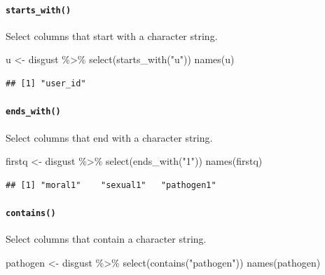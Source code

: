 \documentclass[
  oneside]{book}
\newenvironment{Shaded}{\begin{snugshade}}{\end{snugshade}}
\newcommand{\FunctionTok}[1]{\textcolor[rgb]{0.00,0.00,0.00}{#1}}
\newcommand{\NormalTok}[1]{#1}
\newcommand{\OtherTok}[1]{\textcolor[rgb]{0.56,0.35,0.01}{#1}}
\newcommand{\SpecialCharTok}[1]{\textcolor[rgb]{0.00,0.00,0.00}{#1}}
\newcommand{\StringTok}[1]{\textcolor[rgb]{0.31,0.60,0.02}{#1}}
\begin{document}
\hypertarget{starts_with}{%
\paragraph{\texorpdfstring{\texttt{starts\_with()}}{starts\_with()}}\label{starts_with}}

Select columns that start with a character string.

\begin{Shaded}
\begin{Highlighting}[]
\NormalTok{u }\OtherTok{\textless{}{-}}\NormalTok{ disgust }\SpecialCharTok{\%\textgreater{}\%} \FunctionTok{select}\NormalTok{(}\FunctionTok{starts\_with}\NormalTok{(}\StringTok{"u"}\NormalTok{))}
\FunctionTok{names}\NormalTok{(u)}
\end{Highlighting}
\end{Shaded}

\begin{verbatim}
## [1] "user_id"
\end{verbatim}

\hypertarget{ends_with}{%
\paragraph{\texorpdfstring{\texttt{ends\_with()}}{ends\_with()}}\label{ends_with}}

Select columns that end with a character string.

\begin{Shaded}
\begin{Highlighting}[]
\NormalTok{firstq }\OtherTok{\textless{}{-}}\NormalTok{ disgust }\SpecialCharTok{\%\textgreater{}\%} \FunctionTok{select}\NormalTok{(}\FunctionTok{ends\_with}\NormalTok{(}\StringTok{"1"}\NormalTok{))}
\FunctionTok{names}\NormalTok{(firstq)}
\end{Highlighting}
\end{Shaded}

\begin{verbatim}
## [1] "moral1"    "sexual1"   "pathogen1"
\end{verbatim}

\hypertarget{contains}{%
\paragraph{\texorpdfstring{\texttt{contains()}}{contains()}}\label{contains}}

Select columns that contain a character string.

\begin{Shaded}
\begin{Highlighting}[]
\NormalTok{pathogen }\OtherTok{\textless{}{-}}\NormalTok{ disgust }\SpecialCharTok{\%\textgreater{}\%} \FunctionTok{select}\NormalTok{(}\FunctionTok{contains}\NormalTok{(}\StringTok{"pathogen"}\NormalTok{))}
\FunctionTok{names}\NormalTok{(pathogen)}
\end{Highlighting}
\end{Shaded}
\end{document}
